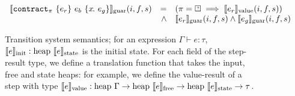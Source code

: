 \begin{figure}
\[\begin{array}{lrl}
    \sysguar{\xctr}(i, f, s) & = & (\PStatus = \PSUnknown \implies \sysvalue{e_r}(i, f, s)) \\
    & \wedge & \sysguar{e_r}(i, f, s) \wedge \sysguar{e_g}(i, f, s) \\
\end{array}
  \]
  \caption{Transition system semantics; for an expression $\Gamma \vdash e: \tau$, $\llbracket e \rrbracket_{\text{init}} : \text{heap~}\llbracket e \rrbracket_{\text{state}}$ is the initial state. For each field of the step-result type, we define a translation function that takes the input, free and state heaps: for example, we define the value-result of a step with type $\llbracket e \rrbracket_{\text{value}}: \text{heap~}\Gamma \to \text{heap~}\llbracket e \rrbracket_{\text{free}} \to \text{heap~}\llbracket e \rrbracket_{\text{state}} \to \tau$.}
  \label{f:system-translation}
\end{figure}